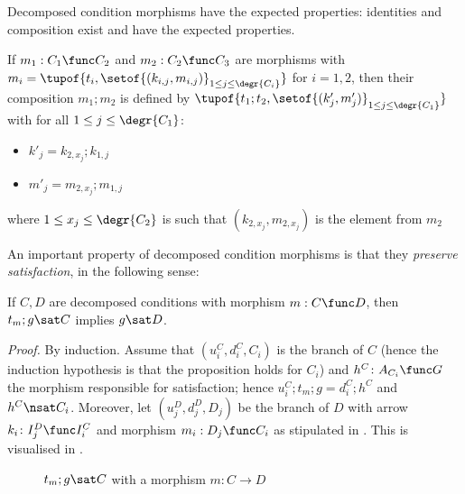 \medskip\noindent Decomposed condition morphisms have the expected properties: identities and composition exist and have the expected properties.

\begin{definition}
\end{definition}

\begin{definition}
  If $m_1:C_1\func C_2$ and $m_2:C_2\func C_3$ are morphisms with $m_i=\tupof{t_i,\setof{(k_{i,j},m_{i,j})}_{1\leq j\leq \degr{C_i}}}$ for $i=1,2$, then their composition $m_1;m_2$ is defined by $\tupof{t_1;t_2,\setof{(k'_j,m'_j)}_{1\leq j\leq \degr{C_1}}}$ with for all $1\leq j\leq \degr{C_1}$:
  \begin{itemize}
  \item $k'_j=k_{2,x_j};k_{1,j}$
  \item $m'_j=m_{2,x_j};m_{1,j}$
  \end{itemize}
  where $1\leq x_j\leq \degr{C_2}$ is such that $(k_{2,x_j},m_{2,x_j})$ is the element from $m_2$ 
\end{definition}

\begin{proposition}
\end{proposition}

\medskip\noindent An important property of decomposed condition morphisms is that they \emph{preserve satisfaction}, in the following sense:
%
\begin{proposition}
If $C,D$ are decomposed conditions with morphism $m:C\func D$, then $t_m;g\sat C$ implies $g\sat D$.
\end{proposition}
%
\emph{Proof.} By induction. Assume that $(u_i^C,d_i^C,C_i)$ is the branch of $C$ (hence the induction hypothesis is that the proposition holds for $C_i$) and $h^C\colon A_{C_i}\func G$ the morphism responsible for satisfaction; hence $u_i^C;t_m;g=d_i^C;h^C$ and $h^C\nsat C_i$. Moreover, let $(u_j^D,d_j^D,D_j)$ be the branch of $D$ with arrow $k_i\colon I_j^D\func I_i^C$ and morphism $m_i:D_j\func C_i$ as stipulated in . This is visualised in .
%
\begin{figure}
  \centering
  
  \caption{$t_m;g\sat C$ with a morphism $m:C\rightarrow D$}
\end{figure}

